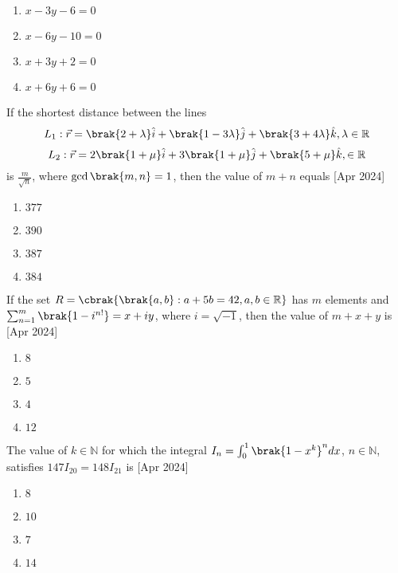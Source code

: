 		\begin{enumerate}
			\item $x-3y-6=0$\\
			\item $x-6y-10=0$\\
			\item $x+3y+2=0$\\
			\item $x+6y+6=0$\\
		\end{enumerate}
	\item If the shortest distance between the lines
		$$L_1:\vec{r}=\brak{2+\lambda}\hat{i}+\brak{1-3\lambda}\hat{j}+\brak{3+4\lambda}\hat{k},    \lambda\in\mathbb{R}$$
		$$L_2:\vec{r}=2\brak{1+\mu}\hat{i}+3\brak{1+\mu}\hat{j}+\brak{5+\mu}\hat{k},\in\mathbb{R}$$
		is $\frac{m}{\sqrt{n}}$, where $\gcd\brak{m,n}=1$, then the value of $m+n$ equals  \hfill{[Apr 2024]}
		\begin{enumerate}
			\item $377$\\
			\item $390$\\
			\item $387$\\
			\item $384$\\
		\end{enumerate}
	\item If the set $R=\cbrak{\brak{a,b}:a+5b=42,a,b\in\mathbb{R}}$ has $m$ elements and $\sum_{n=1}^{m}\brak{1-i^{n!}}=x+iy$, where $i=\sqrt{-1}$, then the value of $m+x+y$ is \hfill{[Apr 2024]}
		\begin{enumerate}
			\item $8$\\
			\item $5$\\
			\item $4$\\
			\item $12$\\
		\end{enumerate}
	\item The value of $k\in\mathbb{N}$ for which the integral $I_n=\int_{0}^{1}{\brak{1-x^k}}^ndx$, $n\in\mathbb{N}$, satisfies $147I_{20}=148I_{21}$ is \hfill{[Apr 2024]}
		\begin{enumerate}
			\item $8$\\
			\item $10$\\
			\item $7$\\
			\item $14$\\
		\end{enumerate}

